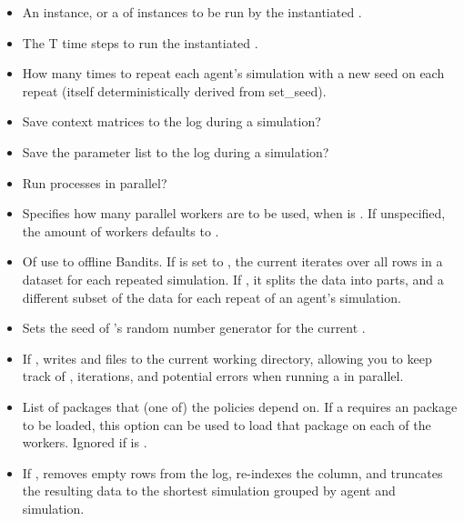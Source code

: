 \documentclass{jss}
\begin{document}
\begin{itemize}
   \item{}{
     An  instance, or a  of  instances to be run by the instantiated .
   }
   \item{}{
     The T time steps to run the instantiated .
   }
   \item{}{
     How many times to repeat each agent's simulation with a new seed on each repeat (itself deterministically derived from set\_seed).
   }
   \item{}{
     Save context matrices  to the  log during a simulation?
   }
   \item{}{
     Save the parameter list  to the  log during a simulation?
   }
   \item{}{
      Run  processes in parallel?
   }
   \item{}{
      Specifies how many parallel workers are to be used, when  is . If unspecified, the amount of workers defaults to .
   }
   \item{}{
      Of use to offline Bandits.
      If  is set to , the current 
      iterates over all rows in a dataset for each repeated simulation.
      If , it splits the data into  parts,
      and a different subset of the data for each repeat of an agent's simulation.
   }
   \item{}{
      Sets the seed of 's random number generator for the current .
   }
   \item{}{
       If ,  writes  and 
       files to the current working directory, allowing you to keep track of , iterations,
       and potential errors when running a  in parallel.
   }
   \item{}{
       List of packages that (one of) the policies depend on. If a  requires an
        package to be loaded, this option can be used to load that package on each of the workers.
       Ignored if  is .
   }
   \item{}{
      If , removes empty rows from the  log,
      re-indexes the  column, and truncates the resulting data to the shortest simulation
      grouped by agent and simulation.
   }
\end{itemize}
\end{document}
